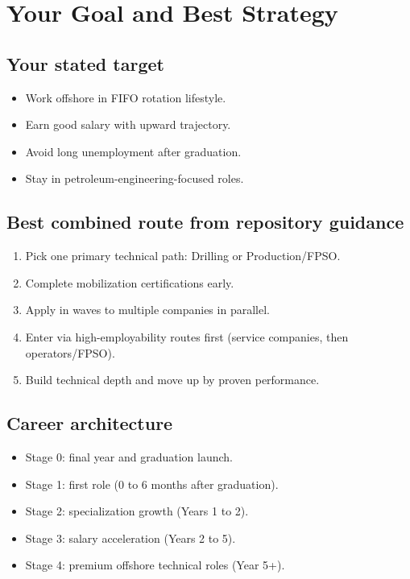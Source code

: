 \documentclass[11pt,openany]{book}
\begin{document}
\chapter{Your Goal and Best Strategy}

\section{Your stated target}
\begin{itemize}
  \item Work offshore in FIFO rotation lifestyle.
  \item Earn good salary with upward trajectory.
  \item Avoid long unemployment after graduation.
  \item Stay in petroleum-engineering-focused roles.
\end{itemize}

\section{Best combined route from repository guidance}
\begin{enumerate}
  \item Pick one primary technical path: Drilling or Production/FPSO.
  \item Complete mobilization certifications early.
  \item Apply in waves to multiple companies in parallel.
  \item Enter via high-employability routes first (service companies, then operators/FPSO).
  \item Build technical depth and move up by proven performance.
\end{enumerate}

\section{Career architecture}
\begin{itemize}
  \item Stage 0: final year and graduation launch.
  \item Stage 1: first role (0 to 6 months after graduation).
  \item Stage 2: specialization growth (Years 1 to 2).
  \item Stage 3: salary acceleration (Years 2 to 5).
  \item Stage 4: premium offshore technical roles (Year 5+).
\end{itemize}
\end{document}
